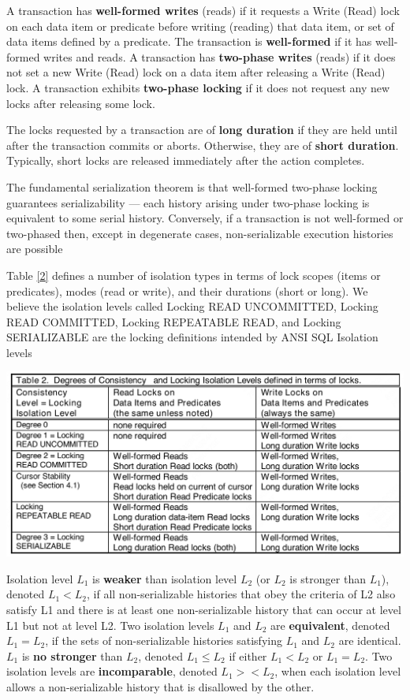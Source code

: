 \documentclass[11pt]{article}
\begin{document}
A transaction has \textbf{well-formed writes} (reads) if it requests a Write (Read) lock on each data item or
predicate before writing (reading) that data item, or set of data items defined by a predicate. The
transaction is \textbf{well-formed} if it has well-formed writes and reads. A transaction has \textbf{two-phase writes}
(reads) if it does not set a new Write (Read) lock on a data item after releasing a Write (Read) lock.
A transaction exhibits \textbf{two-phase locking} if it does not request any new locks after releasing some
lock.

The locks requested by a transaction are of \textbf{long duration} if they are held until after the transaction
commits or aborts. Otherwise, they are of \textbf{short duration}. Typically, short locks are released
immediately after the action completes.

The fundamental serialization theorem is that well-formed two-phase locking guarantees serializability
— each history arising under two-phase locking is equivalent to some serial history. Conversely, if a
transaction is not well-formed or two-phased then, except in degenerate cases, non-serializable
execution histories are possible

Table \ref{2} defines a number of isolation types in terms of lock scopes (items or predicates), modes
(read or write), and their durations (short or long). We believe the isolation levels called Locking
READ UNCOMMITTED, Locking READ COMMITTED, Locking REPEATABLE READ, and Locking SERIALIZABLE are the
locking definitions intended by ANSI SQL Isolation levels

\begin{center}
\includegraphics[width=.7\textwidth]{../../images/papers/118.png}
\label{2}
\end{center}

\begin{definition}[]
Isolation level \(L_1\) is \textbf{weaker} than isolation level \(L_2\) (or \(L_2\) is stronger than \(L_1\)),
denoted \(L_1<L_2\), if all non-serializable histories that obey the criteria of L2 also satisfy L1
and there is at least one non-serializable history that can occur at level L1 but not at level L2. Two
isolation levels \(L_1\) and \(L_2\) are \textbf{equivalent}, denoted \(L_1=L_2\), if the sets of
non-serializable histories satisfying \(L_1\) and \(L_2\) are identical. \(L_1\) is \textbf{no stronger} than
\(L_2\), denoted \(L_1\le L_2\) if either \(L_1<L_2\) or \(L_1=L_2\). Two isolation levels are
\textbf{incomparable}, denoted \(L_1><L_2\), when each isolation level allows a non-serializable history that
is disallowed by the other.
\end{definition}
\end{document}
